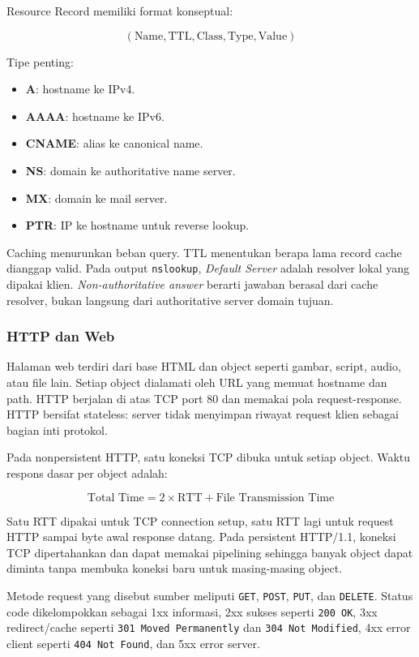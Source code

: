 Resource Record memiliki format konseptual:

\[
(\text{Name}, \text{TTL}, \text{Class}, \text{Type}, \text{Value})
\]

Tipe penting:

\begin{itemize}
    \item \textbf{A}: hostname ke IPv4.
    \item \textbf{AAAA}: hostname ke IPv6.
    \item \textbf{CNAME}: alias ke canonical name.
    \item \textbf{NS}: domain ke authoritative name server.
    \item \textbf{MX}: domain ke mail server.
    \item \textbf{PTR}: IP ke hostname untuk reverse lookup.
\end{itemize}

Caching menurunkan beban query. TTL menentukan berapa lama record cache dianggap valid. Pada output \texttt{nslookup}, \textit{Default Server} adalah resolver lokal yang dipakai klien. \textit{Non-authoritative answer} berarti jawaban berasal dari cache resolver, bukan langsung dari authoritative server domain tujuan.

\subsubsection*{HTTP dan Web}

Halaman web terdiri dari base HTML dan object seperti gambar, script, audio, atau file lain. Setiap object dialamati oleh URL yang memuat hostname dan path. HTTP berjalan di atas TCP port 80 dan memakai pola request-response. HTTP bersifat stateless: server tidak menyimpan riwayat request klien sebagai bagian inti protokol.

Pada nonpersistent HTTP, satu koneksi TCP dibuka untuk setiap object. Waktu respons dasar per object adalah:

\[
\text{Total Time}=2\times \text{RTT}+\text{File Transmission Time}
\]

Satu RTT dipakai untuk TCP connection setup, satu RTT lagi untuk request HTTP sampai byte awal response datang. Pada persistent HTTP/1.1, koneksi TCP dipertahankan dan dapat memakai pipelining sehingga banyak object dapat diminta tanpa membuka koneksi baru untuk masing-masing object.

Metode request yang disebut sumber meliputi \texttt{GET}, \texttt{POST}, \texttt{PUT}, dan \texttt{DELETE}. Status code dikelompokkan sebagai 1xx informasi, 2xx sukses seperti \texttt{200 OK}, 3xx redirect/cache seperti \texttt{301 Moved Permanently} dan \texttt{304 Not Modified}, 4xx error client seperti \texttt{404 Not Found}, dan 5xx error server.

